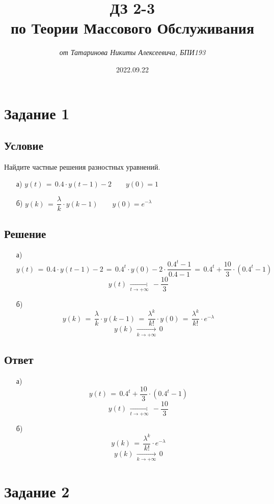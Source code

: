 \documentclass{article}
\title{\textbf{ДЗ 2-3\\по Теории Массового Обслуживания}}
\author{\textit{от Татаринова Никиты Алексеевича, БПИ193}}
\date{2022.09.22}
\begin{document}
\maketitle
\section*{Задание 1}
\subsection*{Условие}
Найдите частные решения разностных уравнений.
\begin{enumerate}
\item[а)] $ y(t) \, = \, 0.4 \! \cdot \! y(t \! - \! 1) \! - \! 2 \qquad y(0) \! = \! 1 $
\item[б)] $ y(k) \, = \, \dfrac{\lambda}{k} \! \cdot \! y(k \! - \! 1) \qquad y(0) \! = \! e^{-\lambda} $
\end{enumerate}
\subsection*{Решение}
\begin{enumerate}
\item[а)]
\[ y(t) \, = \, 0.4 \! \cdot \! y(t \! - \! 1) \! - \! 2 \, = \, 0.4^t \! \cdot \! y(0) \! - \! 2 \! \cdot \! \dfrac{0.4^t \! - \! 1}{0.4 \! - \! 1} \, = \, 0.4^t \! + \! \dfrac{10}{3} \! \cdot \! (0.4^t \! - \! 1) \]
\[ y(t) \, \underset{t \rightarrow +\infty}{\longrightarrow} \, -\dfrac{10}{3} \]
\item[б)]
\[ y(k) \, = \, \dfrac{\lambda}{k} \! \cdot \! y(k \! - \! 1) \, = \, \dfrac{\lambda^k}{k!} \! \cdot \! y(0) \, = \, \dfrac{\lambda^k}{k!} \! \cdot \! e^{-\lambda} \]
\[ y(k) \, \underset{k \rightarrow +\infty}{\longrightarrow} \, 0 \]
\end{enumerate}
\subsection*{Ответ}
\begin{enumerate}
\item[а)]
\[ y(t) \, = \, 0.4^t \! + \! \dfrac{10}{3} \! \cdot \! (0.4^t \! - \! 1) \]
\[ y(t) \, \underset{t \rightarrow +\infty}{\longrightarrow} \, -\dfrac{10}{3} \]
\item[б)]
\[ y(k) \, = \, \dfrac{\lambda^k}{k!} \! \cdot \! e^{-\lambda} \]
\[ y(k) \, \underset{k \rightarrow +\infty}{\longrightarrow} \, 0 \]
\end{enumerate}
\section*{Задание 2}
\end{document}

